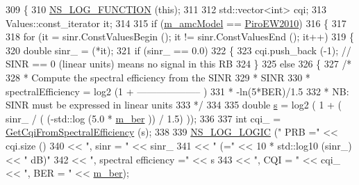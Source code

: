 \begin{DoxyCode}
309 \{
310   \hyperlink{log-macros-disabled_8h_a90b90d5bad1f39cb1b64923ea94c0761}{NS\_LOG\_FUNCTION} (\textcolor{keyword}{this});
311 
312   std::vector<int> cqi;
313   Values::const\_iterator it;
314   
315   \textcolor{keywordflow}{if} (\hyperlink{classns3_1_1LteAmc_aadde02b027dcbeb1274befeccbdbc1da}{m\_amcModel} == \hyperlink{classns3_1_1LteAmc_a2b3b1ed166e80211de82407dea40c157acc4aadfc04b5e099e8e0503e2f1ca049}{PiroEW2010})
316     \{
317 
318       \textcolor{keywordflow}{for} (it = sinr.ConstValuesBegin (); it != sinr.ConstValuesEnd (); it++)
319         \{
320           \textcolor{keywordtype}{double} sinr\_ = (*it);
321           \textcolor{keywordflow}{if} (sinr\_ == 0.0)
322             \{
323               cqi.push\_back (-1); \textcolor{comment}{// SINR == 0 (linear units) means no signal in this RB}
324             \}
325           \textcolor{keywordflow}{else}
326             \{
327               \textcolor{comment}{/*}
328 \textcolor{comment}{              * Compute the spectral efficiency from the SINR}
329 \textcolor{comment}{              *                                        SINR}
330 \textcolor{comment}{              * spectralEfficiency = log2 (1 + -------------------- )}
331 \textcolor{comment}{              *                                    -ln(5*BER)/1.5}
332 \textcolor{comment}{              * NB: SINR must be expressed in linear units}
333 \textcolor{comment}{              */}
334 
335               \textcolor{keywordtype}{double} \hyperlink{generate__test__data__lte__sinr_8m_ad83eeb3a142285d1243a08c6b7026df8}{s} = log2 ( 1 + ( sinr\_ / ( (-std::log (5.0 * \hyperlink{classns3_1_1LteAmc_a85e7b0e6cd9ce70ef91a796033540362}{m\_ber} )) / 1.5) ));
336 
337               \textcolor{keywordtype}{int} cqi\_ = \hyperlink{classns3_1_1LteAmc_a14df653ff95e9941444a956a414aaf5a}{GetCqiFromSpectralEfficiency} (s);
338 
339               \hyperlink{group__logging_ga88acd260151caf2db9c0fc84997f45ce}{NS\_LOG\_LOGIC} (\textcolor{stringliteral}{" PRB ="} << cqi.size ()
340                                     << \textcolor{stringliteral}{", sinr = "} << sinr\_
341                                     << \textcolor{stringliteral}{" (="} << 10 * std::log10 (sinr\_) << \textcolor{stringliteral}{" dB)"}
342                                     << \textcolor{stringliteral}{", spectral efficiency ="} << s
343                                     << \textcolor{stringliteral}{", CQI = "} << cqi\_ << \textcolor{stringliteral}{", BER = "} << \hyperlink{classns3_1_1LteAmc_a85e7b0e6cd9ce70ef91a796033540362}{m\_ber});

\end{DoxyCode}
